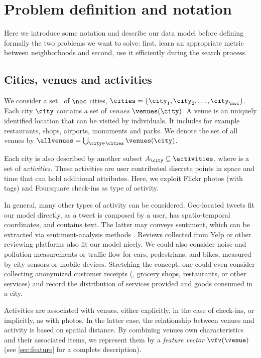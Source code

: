 \chapter{Problem definition and notation}
\label{ch:problem}

Here we introduce some notation and describe our data model before defining
formally the two problems we want to solve: first, learn an appropriate metric
between neighborhoods and second, use it efficiently during the search process.

\section{Cities, venues and activities}
We consider a set \cities\ of $\noc$ cities, 
$\cities=\{\city_1, \city_2, \ldots,\city_\noc\}$.
Each city $\city$ contains a set of \emph{venues} $\venues(\city)$.
A venue is an uniquely identified location that can be visited by individuals.
It includes for example restaurants, shops, airports, monuments and parks.
We denote the set of all venues by $\allvenues = \bigcup_{\city\in\cities} \venues(\city)$.

Each city \city{} is also described by another subset $A_\city \subseteq
\activities$, where \activities{} is a set of \emph{activities}.  These
activities are user contributed discrete points in space and time that can hold
additional attributes. Here, we exploit Flickr photos (with tags) and
Foursquare check-ins as type of activity.

In general, many other types of activity can be considered.  Geo-located tweets
fit our model directly, as a tweet is composed by a user, has spatio-temporal
coordinates, and contains text. The latter may conveys sentiment, which can be
extracted via sentiment-analysis methods \autocite{SentimentAnalysis08}.
Reviews collected from Yelp or other reviewing platforms also fit our model
nicely.  We could also consider noise and pollution measurements or traffic
flow for cars, pedestrians, and bikes, measured by city sensors or mobile
devices.  Stretching the concept, one could even consider collecting anonymized
customer receipts (\eg{}, grocery shops, restaurants, or other services) and
record the distribution of services provided and goods consumed in a city.

Activities are associated with venues, either explicitly, in the case of
check-ins, or implicitly, as with photos. In the latter case, the relationship
between venues and activity is based on spatial distance.  By combining venues
own characteristics and their associated items, we represent them by a {\em
feature vector} $\vfv(\venue)$ (see \autoref{sec:feature}
 for a complete description).


